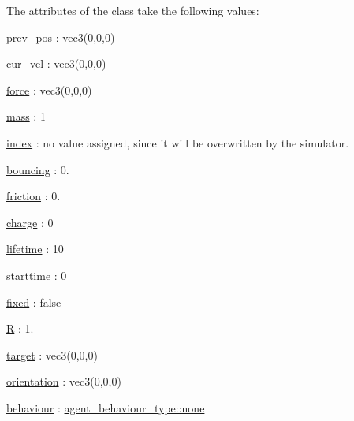 The attributes of the class take the following values\+:
\begin{DoxyItemize}
\item \hyperlink{classphysim_1_1particles_1_1base__particle_a08072db6a1a59d21acc9cac6ac8965f7}{prev\+\_\+pos} \+: vec3(0,0,0)
\item \hyperlink{classphysim_1_1particles_1_1base__particle_a66a164d2a130c40901e3ec2709cdad43}{cur\+\_\+vel} \+: vec3(0,0,0)
\item \hyperlink{classphysim_1_1particles_1_1base__particle_adc3b11899d2e50970ae5d4931721a0ef}{force} \+: vec3(0,0,0)
\item \hyperlink{classphysim_1_1particles_1_1base__particle_acb5c9f0b4a911d8981210e2cfc4dda8a}{mass} \+: 1
\item \hyperlink{classphysim_1_1particles_1_1base__particle_a44f5de3bb4b860dfd511e28e1d6519d5}{index} \+: no value assigned, since it will be overwritten by the simulator.
\item \hyperlink{classphysim_1_1particles_1_1free__particle_aac766fa5294e47b944d32ca3e38d47fa}{bouncing} \+: 0.
\item \hyperlink{classphysim_1_1particles_1_1free__particle_a9e7dfd81e9392fc42b3faecb57afdc02}{friction} \+: 0.
\item \hyperlink{classphysim_1_1particles_1_1free__particle_a7513ac41f3cab1ce083f8695e2c73301}{charge} \+: 0
\item \hyperlink{classphysim_1_1particles_1_1free__particle_a5870d6fd3167d2c6120f887f45fe50fc}{lifetime} \+: 10
\item \hyperlink{classphysim_1_1particles_1_1free__particle_ad0379ba926ecc909bfbfb373045bfcf9}{starttime} \+: 0
\item \hyperlink{classphysim_1_1particles_1_1free__particle_a0f6d69caeac140abd74c7be4ed55eb74}{fixed} \+: false
\item \hyperlink{classphysim_1_1particles_1_1sized__particle_ac67d5df84b91bb12152c8691dd43e98c}{R} \+: 1.
\item \hyperlink{classphysim_1_1particles_1_1agent__particle_a0658207e11a5d39844856233ae8bf2cb}{target} \+: vec3(0,0,0)
\item \hyperlink{classphysim_1_1particles_1_1agent__particle_a87b2554699454e6850f1d2b48e278f63}{orientation} \+: vec3(0,0,0)
\item \hyperlink{classphysim_1_1particles_1_1agent__particle_af219e3f46630bb7f51f3d00952ed4f1c}{behaviour} \+: \hyperlink{namespacephysim_1_1particles_a033757595f7862a0fc8a389d79bf9c88a334c4a4c42fdb79d7ebc3e73b517e6f8}{agent\+\_\+behaviour\+\_\+type\+::none}

\end{DoxyItemize}
